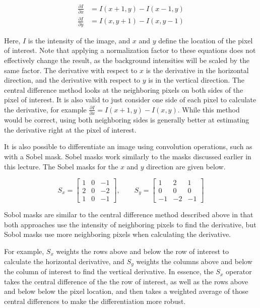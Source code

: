 \documentclass[twoside]{article}
\begin{document}
\begin{equation}
  \label{cendiff}
  \begin{aligned}
    \frac{\partial I} {\partial x} &= I(x+1,y) - I(x-1,y)\\        
    \frac{\partial I} {\partial y} &= I(x,y+1) - I(x,y-1)
  \end{aligned}
\end{equation}

Here, $I$ is the intensity of the image, and $x$ and $y$ define the location of the pixel of interest. Note that applying a normalization factor to these equations does not effectively change the result, as the background intensities will be scaled by the same factor. The derivative with respect to $x$ is the derivative in the horizontal direction, and the derivative with respect to $y$ is in the vertical direction. The central difference method looks at the neighboring pixels on both sides of the pixel of interest. It is also valid to just consider one side of each pixel to calculate the derivative, for example $\frac{\partial I}{\partial x} = I(x+1,y) - I(x,y)$. While this method would be correct, using both neighboring sides is generally better at estimating the derivative right at the pixel of interest. 

It is also possible to differentiate an image using convolution operations, such as with a Sobel mask.  Sobel masks work similarly to the masks discussed earlier in this lecture. The Sobel masks for the $x$ and $y$ direction are given below.

\[
S_x =
\begin{bmatrix}
1 & 0 & -1\\
2 & 0 & -2\\
1 & 0 & -1
\end{bmatrix}
, \qquad S_y = 
\begin{bmatrix}
1 & 2 & 1\\
0 & 0 & 0\\
-1 & -2 & -1
\end{bmatrix}
\]

Sobol masks are similar to the central difference method described above in that both approaches use the intensity of neighboring pixels to find the derivative, but Sobol masks use more neighboring pixels when calculating the derivative.

For example, $S_x$ weights the rows above and below the row of interest to calculate the horizontal derivative, and $S_y$ weights the columns above and below the column of interest to find the vertical derivative. In essence, the $S_x$ operator takes the central difference of the the row of interest, as well as the rows above and below below the pixel location, and then takes a weighted average of those central differences to make the differentiation more robust.
\end{document}
